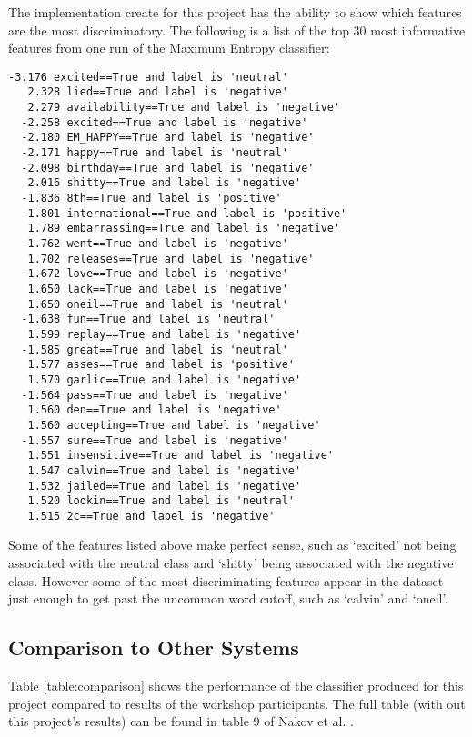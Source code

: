 \documentclass[final,3p,12pt]{elsarticle}
\begin{document}
The implementation create for this project has the ability to show which
features are the most discriminatory. The following is a list of the top 30
most informative features from one run of the Maximum Entropy classifier:

\begin{Verbatim}[fontsize=\footnotesize]
  -3.176 excited==True and label is 'neutral'
   2.328 lied==True and label is 'negative'
   2.279 availability==True and label is 'negative'
  -2.258 excited==True and label is 'negative'
  -2.180 EM_HAPPY==True and label is 'negative'
  -2.171 happy==True and label is 'neutral'
  -2.098 birthday==True and label is 'negative'
   2.016 shitty==True and label is 'negative'
  -1.836 8th==True and label is 'positive'
  -1.801 international==True and label is 'positive'
   1.789 embarrassing==True and label is 'negative'
  -1.762 went==True and label is 'negative'
   1.702 releases==True and label is 'negative'
  -1.672 love==True and label is 'negative'
   1.650 lack==True and label is 'negative'
   1.650 oneil==True and label is 'neutral'
  -1.638 fun==True and label is 'neutral'
   1.599 replay==True and label is 'negative'
  -1.585 great==True and label is 'neutral'
   1.577 asses==True and label is 'positive'
   1.570 garlic==True and label is 'negative'
  -1.564 pass==True and label is 'negative'
   1.560 den==True and label is 'negative'
   1.560 accepting==True and label is 'negative'
  -1.557 sure==True and label is 'negative'
   1.551 insensitive==True and label is 'negative'
   1.547 calvin==True and label is 'negative'
   1.532 jailed==True and label is 'negative'
   1.520 lookin==True and label is 'neutral'
   1.515 2c==True and label is 'negative'
\end{Verbatim}

Some of the features listed above make perfect sense, such as `excited' not
being associated with the neutral class and `shitty' being associated with the
negative class. However some of the most discriminating features appear in the
dataset just enough to get past the uncommon word cutoff, such as `calvin' and
`oneil'.

\subsection{Comparison to Other Systems}
\label{ssection:comparison}

Table \ref{table:comparison} shows the performance of the classifier produced
for this project compared to results of the workshop participants. The full
table (with out this project's results) can be found in table 9 of Nakov et al.
\cite{Nakov2013}.
\end{document}
